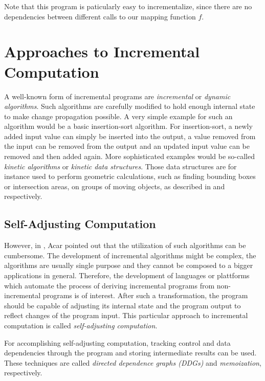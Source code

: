 Note that this program is paticularly easy to incrementalize, since there are no dependencies between different calls to our mapping function $f$. 
\section{Approaches to Incremental Computation}


A well-known form of incremental programs are \textit{incremental} or \textit{dynamic algorithms}. Such algorithms are carefully modified to hold enough internal state to make change propagation possible. A very simple example for such an algorithm would be a basic insertion-sort algorithm. For insertion-sort, a newly added input value can simply be inserted into the output, a value removed from the input can be removed from the output and an updated input value can be removed and then added again. More sophisticated examples would be so-called \textit{kinetic algorithms} or \textit{kinetic data structures}. Those data structures are for instance used to perform geometric calculations, such as finding bounding boxes or intersection areas, on groups of moving objects, as described in \cite{yu2008practical} and \cite{basch2004kinetic} respectively.

\subsection{Self-Adjusting Computation}

However, in \cite{Acar2005thesis}, Acar pointed out that the utilization of such algorithms can be cumbersome. The development of incremental algorithms might be complex, the algorithms are usually single purpose and they cannot be composed to a bigger applications in general. Therefore, the development of languages or plattforms which automate the process of deriving incremental programs from non-incremental programs is of interest. After such a transformation, the program should be capable of adjusting its internal state and the program output to reflect changes of the program input. This particular approach to incremental computation is called \textit{self-adjusting computation}.

For accomplishing self-adjusting computation, tracking control and data dependencies through the program and storing intermediate results can be used. These techniques are called \textit{directed dependence graphs (DDGs)} and \textit{memoization}, respectively. 

